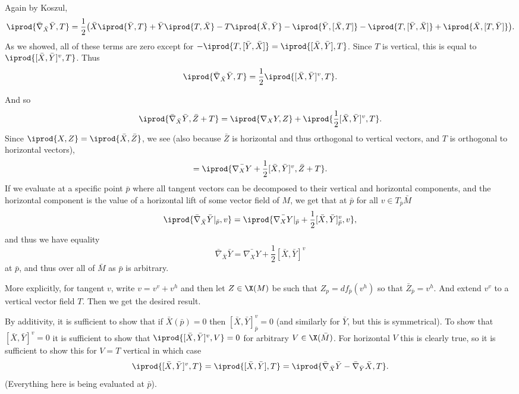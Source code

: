     Again by Koszul,
    $$ \iprod{\bar\nabla_{\bar X}\bar Y,T} = \frac12\bigl(\bar X\iprod{\bar Y,T} + \bar Y\iprod{T,\bar X} - T\iprod{\bar X,\bar Y}
        - \iprod{\bar Y,[\bar X,T]} - \iprod{T,[\bar Y,\bar X]} + \iprod{\bar X,[T,\bar Y]}\bigr) . $$
    As we showed, all of these terms are zero except for $-\iprod{T,[\bar Y,\bar X]}=\iprod{[\bar X,\bar Y],T}$.
    Since $T$ is vertical, this is equal to $\iprod{[\bar X,\bar Y]^v,T}$.
    Thus
    $$ \iprod{\bar\nabla_{\bar X}\bar Y,T} = \frac12\iprod{[\bar X,\bar Y]^v,T} . $$

    And so
    $$ \iprod{\bar\nabla_{\bar X}\bar Y,\bar Z+T} = \iprod{\nabla_XY,Z} + \iprod{\frac12[\bar X,\bar Y]^v,T} . $$
    Since $\iprod{X,Z}=\iprod{\bar X,\bar Z}$, we see (also because $\bar Z$ is horizontal and thus orthogonal to vertical vectors, and $T$ is orthogonal to horizontal vectors),
    $$ = \iprod{\bar{\nabla_XY} + \frac12[\bar X,\bar Y]^v,\bar Z + T} . $$
    If we evaluate at a specific point $\bar p$ where all tangent vectors can be decomposed to their vertical and horizontal components, and the horizontal component is the value of
    a horizontal lift of some vector field of $M$, we get that at $\bar p$ for all $v\in T_{\bar p}\bar M$
    $$ \iprod{\bar\nabla_{\bar X}\bar Y|_{\bar p},v} = \iprod{\bar{\nabla_XY}|_{\bar p} + \frac12[\bar X,\bar Y]^v_{\bar p},v} , $$
    and thus we have equality
    $$ \bar\nabla_{\bar X}\bar Y = \bar{\nabla_XY} + \frac12[\bar X,\bar Y]^v $$
    at $\bar p$, and thus over all of $\bar M$ as $\bar p$ is arbitrary.

    More explicitly, for tangent $v$, write $v=v^v+v^h$ and then let $Z\in\X(M)$ be such that $Z_p=df_{\bar p}(v^h)$ so that $\bar Z_{\bar p}=v^h$.
    And extend $v^v$ to a vertical vector field $T$.
    Then we get the desired result.

    \item By additivity, it is sufficient to show that if $\bar X(\bar p)=0$ then $[\bar X,\bar Y]^v_{\bar p}=0$ (and similarly for $\bar Y$, but this is symmetrical).
    To show that $[\bar X,\bar Y]^v=0$ it is sufficient to show that $\iprod{[\bar X,\bar Y]^v,V}=0$ for arbitrary $V\in\X(\bar M)$.
    For horizontal $V$ this is clearly true, so it is sufficient to show this for $V=T$ vertical in which case
    $$ \iprod{[\bar X,\bar Y]^v,T} = \iprod{[\bar X,\bar Y],T} = \iprod{\bar\nabla_{\bar X}\bar Y-\bar\nabla_{\bar Y}\bar X,T} . $$
    (Everything here is being evaluated at $\bar p$).

